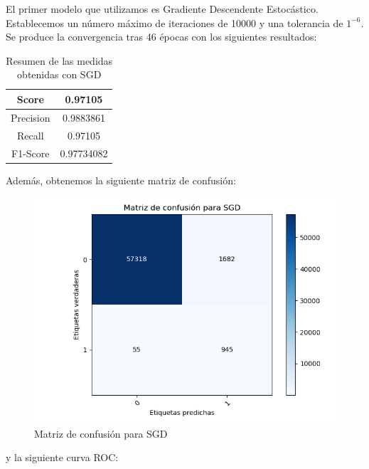 El primer modelo que utilizamos es Gradiente Descendente Estocástico. Establecemos un número máximo de iteraciones de 10000 y una tolerancia de $1^{-6}$. Se produce la convergencia tras 46 épocas con los siguientes resultados:

\begin{table}[H]
	\centering
	\begin{tabular}{|c|c|}
		\hline
		Score     & 0.97105    \\ \hline
		Precision & 0.9883861  \\ \hline
		Recall    & 0.97105    \\ \hline
		F1-Score  & 0.97734082 \\ \hline
	\end{tabular}
	\caption{Resumen de las medidas obtenidas con SGD}
\end{table}

Además, obtenemos la siguiente matriz de confusión:

\begin{figure}[H] %
	\centering
	\includegraphics[scale=0.6]{SGDConf.png}  %
	\caption{Matriz de confusión para SGD} 
	\label{fig:sgd-conf}
\end{figure}

y la siguiente curva ROC:

